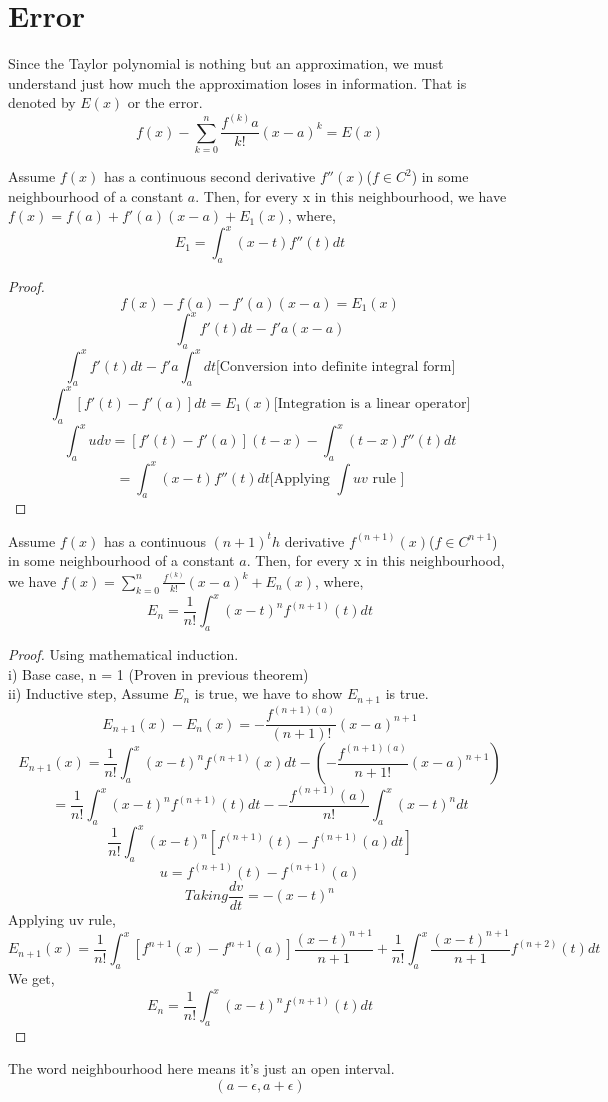 \documentclass[twoside]{report}
\begin{document}
\section{Error} %
Since the Taylor polynomial is nothing but an approximation, we must understand just how much the approximation loses in information. That is denoted by $E(x)$ or the error.
\[
f(x) - \sum_{k=0}^{n} \frac{f^{(k)}a}{k!}(x-a)^{k} = E(x)
\]
\begin{theorem}
	Assume $f(x)$ has a continuous second derivative $f''(x)$($f \in C^2$) in some neighbourhood of a constant $a$. Then, for every x in this neighbourhood, we have $f(x) = f(a) + f'(a)(x-a) + E_1(x)$, 
	where, 
	\[
		E_1 = \int_a^x (x-t) f''(t) dt
	\]	
\end{theorem}
\begin{proof}
	\[
		f(x) - f(a) - f'(a)(x-a) = E_1(x)
	\]	
	\[
	   \int_{a}^{x} f'(t)dt - f'a(x-a)
	\]
	\[
	   \int_{a}^{x} f'(t)dt - f'a \int_a^x dt \text{[Conversion into definite integral form]}
	\]
	\[
	   \int_{a}^{x}[f'(t) - f'(a)] dt = E_1(x) \text{[Integration is a linear operator]}
	\]
	\[
	   \int_{a}^{x} udv = [f'(t) - f'(a)](t-x) - \int_{a}^{x} (t-x)f''(t)dt
	\]
	\[
	   = \int_{a}^{x} (x-t)f''(t) dt \text{[Applying $\int uv$ rule  ]}
	\]
\end{proof}
\pagebreak
\begin{theorem}
   Assume $f(x)$ has a continuous $(n+1)^th$ derivative $f^{(n+1)}(x)$($f \in C^{n+1}$) in some neighbourhood of a constant $a$. Then, for every x in this neighbourhood, we have $f(x) = \sum_{k=0}^{n}\frac{f^{(k)}}{k!}(x-a)^k+ E_n(x)$, 
	where, 
	\[
	   E_n = \frac{1}{n!}\int_a^x (x-t)^n f^{(n+1)}(t) dt
	\]	
\end{theorem}
\begin{proof}
	Using  mathematical induction.		\\
	i) Base case, n = 1 (Proven in previous theorem) \\
	ii) Inductive step, Assume $E_n$ is true, we have to show $E_{n+1}$ is true.  
	\[
	   E_{n+1}(x) - E_n(x) = -\frac{f^{(n+1)(a)}}{(n+1)!}(x-a)^{n+1}
	\]
	\[
	   E_{n+1}(x) = \frac{1}{n!} \int_a^x (x-t)^n f^{(n+1)}(x) dt - (- \frac{f^{(n+1)(a)}}{n+1!}(x-a)^{n+1})
	\]
	\[
	= \frac{1}{n!} \int_{a}^{x} (x-t)^n f^{(n+1)}(t) dt - - \frac{f^{(n+1)}(a)}{n!} \int_{a}^{x} (x-t)^n dt
     \]
     \[
  \frac{1}{n!} \int_{a}^{x} (x-t)^n [f^{(n+1)}(t) - f^{(n+1)}(a)dt]
     \]
     \[
	u = f^{(n+1)}(t) - f^{(n+1)}(a)
     \]
     \[
	Taking \frac{dv}{dt} = -(x-t)^n
     \]
     Applying uv rule,
     \[
	E_{n+1}(x) = \frac{1}{n!} \int_{a}^{x} [f^{n+1}(x) - f^{n+1}(a)] \frac{(x-t)^{n+1}}{n+1} + \frac{1}{n!} \int_{a}^{x} \frac{(x-t)^{n+1}}{n+1} f^{(n+2)}(t) dt
     \]
     We get,
     \[
	   E_n = \frac{1}{n!}\int_a^x (x-t)^n f^{(n+1)}(t) dt
     \]
\end{proof}
\begin{note}
	 The word neighbourhood here means it's just an open interval. 
	 \[
	    (a - \epsilon, a + \epsilon)
	 \]
\end{note}
\pagebreak
\end{document}
